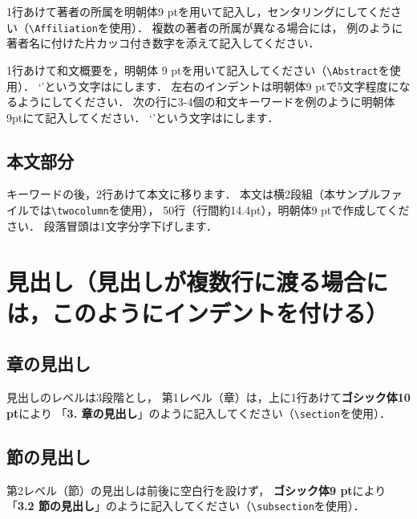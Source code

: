 \documentclass[a4paper]{jarticle}
\renewcommand{\baselinestretch}{1.32}
\begin{document}
1行あけて著者の所属を明朝体9 ptを用いて記入し，センタリングにしてください（\verb+\Affiliation+を使用）．
複数の著者の所属が異なる場合には，
例のように著者名に付けた片カッコ付き数字を添えて記入してください．

1行あけて和文概要を，明朝体 9 ptを用いて記入してください（\verb+\Abstract+を使用）．
`'という文字はにします．
左右のインデントは明朝体9 ptで5文字程度になるようにしてください．
次の行に3-4個の和文キーワードを例のように明朝体9ptにて記入してください．
`'という文字はにします．

\subsection{本文部分}

キーワードの後，2行あけて本文に移ります．
本文は横2段組（本サンプルファイルでは\verb+\twocolumn+を使用），
50行（行間約14.4pt），明朝体9 ptで作成してください．
段落冒頭は1文字分字下げします．

\begingroup
\renewcommand{\baselinestretch}{0.9}
\section{見出し（見出しが複数行に渡る場合には，このようにインデントを付ける）}
\endgroup

\subsection{章の見出し}%

見出しのレベルは3段階とし，
第1レベル（章）は，上に1行あけて{\bf ゴシック体10 pt}により
「{\bf 3. 章の見出し}」のように記入してください（\verb+\section+を使用）．

\subsection{節の見出し}

第2レベル（節）の見出しは前後に空白行を設けず，
{\bf ゴシック体9 pt}により「{\bf 3.2 節の見出し}」のように記入してください（\verb+\subsection+を使用）．
\end{document}
